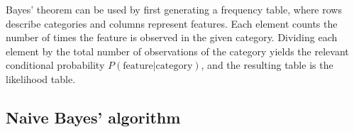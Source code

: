\documentclass[]{article}
\begin{document}
Bayes' theorem can be used by first generating a frequency table, where rows describe categories and columns represent features.  Each element counts the number of times the feature is observed in the given category.  Dividing each element by the total number of observations of the category yields the relevant conditional probability $P(\text{feature}|\text{category})$, and the resulting table is the likelihood table.

\subsection{Naive Bayes' algorithm}
\end{document}
